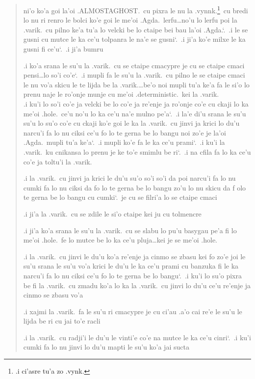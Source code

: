 \documentclass{report}
\newcommand\sds{\spacefactor\sfcode`.\ \space}
\begin{document}
\begin{quote}
	ni'o ko'a goi la'oi .ALMOSTAGHOST.\ cu pixra le nu la .vynnk.\footnote{.i ci'asre tu'a zo .vynk.}\ cu bredi lo nu ri renro le bolci ko'e goi le me'oi .Agda.\ lerfu\ldots no'u lo lerfu poi la .varik.\ cu pilno ke'a tu'a lo velcki be lo ctaipe bei bau la'oi .Agda.\sds  .i le se gusni cu mutce le ka ce'u tolpanra le na'e se gusni\sds  .i ji'a ko'e milxe le ka gusni fi ce'u\sds  .i ji'a bumru

	.i ko'a srana le su'u la .varik.\ cu se ctaipe cmacypre je cu se ctaipe cmaci pensi\ldots lo so'i co'e\sds  .i mupli fa le su'u la .varik.\ cu pilno le se ctaipe cmaci le nu vo'a skicu le te lijda be la .varik.\ldots be'o noi mupli tu'a ke'a fa le si'o lo prenu naje le ro'onje munje cu me'oi .deterministic.\ kei la .varik. \\
	.i ku'i lo so'i co'e ja velcki be lo co'e ja re'enje ja ro'onje co'e cu ckaji lo ka me'oi .hole.\ ce'u no'u lo ka ce'u na'e mulno pe'a\sds  .i la'e di'u srana le su'u su'u lo su'o co'e cu ckaji ko'e goi le ka la .varik.\ cu jinvi ja krici lo du'u narcu'i fa lo nu ciksi ce'u fo lo te gerna be lo bangu noi zo'e je la'oi .Agda.\ mupli tu'a ke'a\sds  .i mupli ko'e fa le ka ce'u prami\sds  .i ku'i la .varik.\ ku cnikansa lo prenu je ke to'e smimlu be ri\sds  .i na cfila fa lo ka ce'u co'e ja toltu'i la .varik.

	.i la .varik.\ cu jinvi ja krici le du'u su'o so'i so'i da poi narcu'i fa lo nu cumki fa lo nu ciksi da fo lo te gerna be lo bangu zo'u lo nu skicu da f olo te gerna be lo bangu cu cumki\sds je cu se filri'a lo se ctaipe cmaci

	.i ji'a la .varik.\ cu se zdile le si'o ctaipe kei ju cu tolmencre

	.i ji'a ko'a srana le su'u la .varik.\ cu se slabu lo pu'u basygau pe'a fi lo me'oi .hole.\ fe lo mutce be lo ka ce'u pluja\ldots kei je se me'oi .hole.

	.i la .varik.\ cu jinvi le du'u ko'a re'enje ja cinmo se zbasu kei fo zo'e joi le su'u srana le su'u vo'a krici le du'u le ka ce'u prami cu banzuka fi le ka narcu'i fa lo nu ciksi ce'u fo lo te gerna be lo bangu\sds  .i ku'i lo su'o pixra be fi la .varik.\ cu zmadu ko'a lo ka la .varik.\ cu jinvi lo du'u ce'u re'enje ja cinmo se zbasu vo'a

	.i xajmi la .varik.\ fa le su'u ri cmacypre je cu ci'au .a'o cai re'e le su'u le lijda be ri cu jai to'e racli

	.i la .varik.\ cu radji'i le du'u le vinti'e co'e na mutce le ka ce'u cinri\sds  .i ku'i cumki fa lo nu jinvi lo du'u mapti le su'u ko'a jai sucta


\end{quote}
\end{document}
